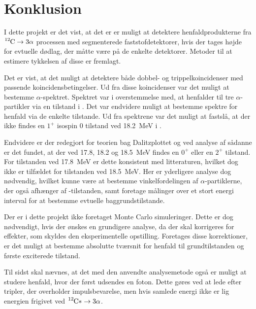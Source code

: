 \chapter{Konklusion}
\label{cha:konklusion}

I dette projekt er det vist, at det er er muligt at detektere henfaldprodukterne fra $\Carb
\rightarrow 3\alpha$ processen med segmenterede faststofdetektorer, hvis der tages højde for
evtuelle dødlag, der måtte være på de enkelte detektorer. Metoder til at estimere tykkelsen af
disse er fremlagt.


Det er vist, at det muligt at detektere både dobbel- og trippelkoincidenser med passende
koincidensbetingelser. Ud fra disse koincidenser var det muligt at bestemme $\alpha$-spektret. Spektret
var i overstemmelse med, at \Carb henfalder til tre $\alpha$-partikler via en tilstand i \Be. Det var
endvidere muligt at bestemme spektre for henfald via de enkelte tilstande. Ud fra spektrene var det
muligt at fastslå, at der ikke findes en $1^{+}$ isospin 0 tilstand ved \SI{18.2}{\MeV} i \Carb.

Endvidere er der redegjort for teorien bag Dalitzplottet og ved analyse af sådanne er det fundet, at
der ved \num{17.8}, \num{18.2} og \SI{18.5}{\MeV} findes en $0^{+}$ eller en $2^{+}$ tilstand. For
tilstanden ved \SI{17.8}{\MeV} er dette konsistent med litteraturen, hvilket dog ikke er tilfældet
for tilstanden ved \SI{18.5}{\MeV}. Her er yderligere analyse dog nødvendig, hvilket kunne være at
bestemme vinkelfordelingen af $\alpha$-partiklerne, der også afhænger af \Carb-tilstanden, samt foretage
målinger over et stort energi interval for at bestemme evtuelle baggrundstilstande. 

Der er i dette projekt ikke foretaget Monte Carlo simuleringer. Dette er dog nødvendigt, hvis der
ønskes en grundigere analyse, da der skal korrigeres for effekter, som skyldes den eksperimentelle
opstilling. Foretages disse korrektioner, er det muligt at bestemme absolutte tværsnit for henfald
til grundtilstanden og første exciterede tilstand. 

Til sidst skal nævnes, at det med den anvendte analysemetode også er muligt at studere henfald, hvor
der først udsendes en foton. Dette gøres ved at lede efter tripler, der overholder impulsbevarelse,
men hvis samlede energi ikke er lig energien frigivet ved $\Carb* \rightarrow 3\alpha$. 







